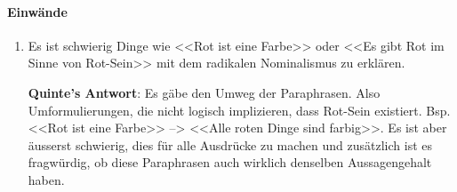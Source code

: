 \documentclass[../main.tex]{subfiles}
\begin{document}
\paragraph{Einwände}
\begin{enumerate}
	\item Es ist schwierig Dinge wie <<Rot ist eine Farbe>> oder <<Es gibt Rot im Sinne von Rot-Sein>> mit dem radikalen Nominalismus zu erklären. 
		
		\textbf{Quinte's Antwort}: Es gäbe den Umweg der Paraphrasen. Also Umformulierungen, die nicht logisch implizieren, dass Rot-Sein existiert. Bsp. <<Rot ist eine Farbe>> --> <<Alle roten Dinge sind farbig>>. Es ist aber äusserst schwierig, dies für alle Ausdrücke zu machen und zusätzlich ist es fragwürdig, ob diese Paraphrasen auch wirklich denselben Aussagengehalt haben. 
\end{enumerate}
\end{document}
